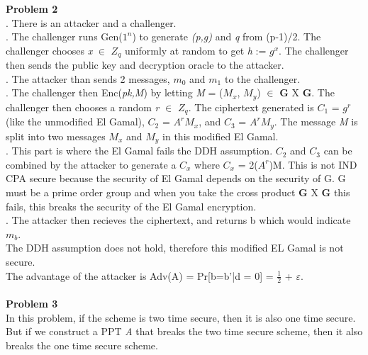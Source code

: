 \documentclass[10pt]{article}
\begin{document}
\noindent \large \textbf{Problem 2}\\
. There is an attacker and a challenger.\\
. The challenger runs Gen($1^{n}$) to generate \emph{(p,g)} and \emph{q} from (p-1)/2. The challenger chooses \emph{x} $\in$ \textbf{$Z_{q}$} uniformly at random to get \emph{h} := \emph{$g^{x}$}. The challenger then sends the public key and decryption oracle to the attacker.\\
. The attacker than sends 2 messages, $m_{0}$ and $m_{1}$ to the challenger.\\
. The challenger then Enc(\emph{pk,M}) by letting \emph{M} = ($M_{x}$, $M_{y}$) $\in$ \textbf{G} X \textbf{G}. The challenger then chooses a random \emph{r} $\in$ \textbf{$Z_{q}$}. The ciphertext generated is $C_{1}$ = $g^{r}$ (like the unmodified El Gamal), $C_{2}$ = $A^{r}$$M_{x}$, and $C_{3}$ = $A^{r}$$M_{y}$. The message \emph{M} is split into two messages $M_{x}$ and $M_{y}$ in this modified El Gamal.\\
. This part is where the El Gamal fails the DDH assumption. $C_{2}$ and $C_{3}$ can be combined by the attacker to generate a $C_{x}$ where $C_{x}$ = 2($A^{r}$)M. This is not IND CPA secure because the security of El Gamal depends on the security of G. G must be a prime order group and when you take the cross product \textbf{G} X \textbf{G} this fails, this breaks the security of the El Gamal encryption.\\
. The attacker then recieves the ciphertext, and returns b which would indicate $m_{b}$.\\

\indent The DDH assumption does not hold, therefore this modified EL Gamal is not secure.\\

\indent The advantage of the attacker is Adv(A) = Pr[b=b'|d = 0] = $\frac{1}{2}$ + $\varepsilon$.\\
\\


\noindent \large \textbf{Problem 3}\\
\indent In this problem, if the scheme is two time secure, then it is also one time secure. But if we construct a PPT \emph{A} that breaks the two time secure scheme, then it also breaks the one time secure scheme.\\
\end{document}
